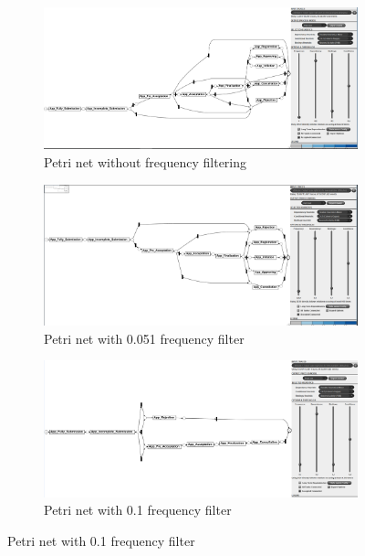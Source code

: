 \begin{figure}[!htbp]
\centering
\begin{subfigure}{.4\textwidth}
  \centering
  \includegraphics[width=\linewidth]{App_DirectlyFollowedFreq0.PNG}
  \caption{Petri net without frequency filtering}
  \label{fig:APP_DFG0}
\end{subfigure}%
\begin{subfigure}{.4\textwidth}
  \centering
  \includegraphics[width=\linewidth]{App_DirectlyFollowedFreq0-051.PNG}
  \caption{Petri net with 0.051 frequency filter}
  \label{fig:APP_DFG0-51}
\end{subfigure}
\begin{subfigure}{.4\textwidth}
  \centering
  \includegraphics[width=\linewidth]{App_DirectlyFollowedFreq0-1.PNG}
  \caption{Petri net with 0.1 frequency filter}

\end{subfigure}
\end{figure}
